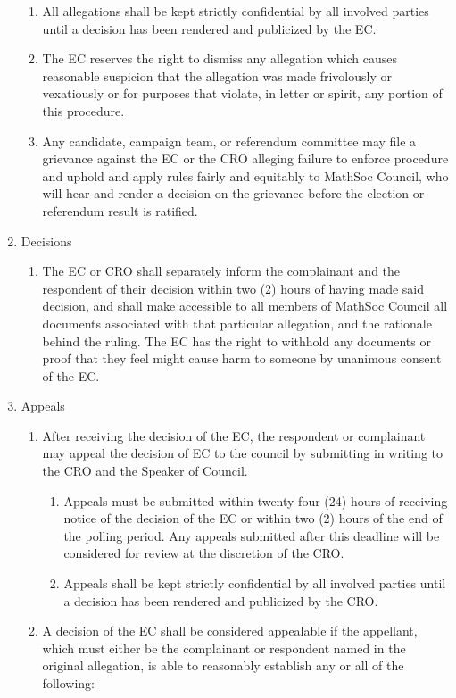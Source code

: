 \begin{enumerate}
\begin{enumerate}
			\item All allegations shall be kept strictly confidential by all involved parties until a decision has been rendered and publicized by the EC.
			\item The EC reserves the right to dismiss any allegation which causes reasonable suspicion that the allegation was made frivolously or vexatiously or for purposes that violate, in letter or spirit, any portion of this procedure.
			\item Any candidate, campaign team, or referendum committee may file a grievance against the EC or the CRO alleging failure to enforce procedure and uphold and apply rules fairly and equitably to MathSoc Council, who will hear and render a decision on the grievance before the election or referendum result is ratified.
		\end{enumerate}
	\item Decisions 
		\begin{enumerate}
			\item The EC or CRO shall separately inform the complainant and the respondent of their decision within two (2) hours of having made said decision, and shall make accessible to all members of MathSoc Council all documents associated with that particular allegation, and the rationale behind the ruling. The EC has the right to withhold any documents or proof that they feel might cause harm to someone by unanimous consent of the EC.
		\end{enumerate}
	\item Appeals 
		\begin{enumerate}
			\item After receiving the decision of the EC, the respondent or complainant may appeal the decision of EC to the council by submitting in writing to the CRO and the Speaker of Council.
				\begin{enumerate}
					\item Appeals must be submitted within twenty-four (24) hours of receiving notice of the decision of the EC or within two (2) hours of the end of the polling period. Any appeals submitted after this deadline will be considered for review at the discretion of the CRO.
					\item Appeals shall be kept strictly confidential by all involved parties until a decision has been rendered and publicized by the CRO.
				\end{enumerate}
			\item A decision of the EC shall be considered appealable if the appellant, which must either be the complainant or respondent named in the original allegation, is able to reasonably establish any or all of the following:

\end{enumerate}
\end{enumerate}

